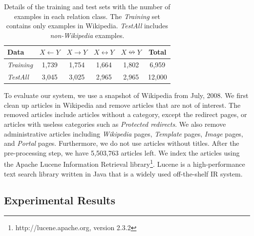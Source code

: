 \begin{table}[h]
  \small
  \begin{center}
    \begin{tabular}{|l||c|c|c|c|c|}
      \hline
      Data & $X \leftarrow Y$ & $X \rightarrow Y$  & $X \leftrightarrow Y$  & $X \nleftrightarrow Y$ & Total \\
      \hline
      \hline
      {\em Training}  & 1,739 & 1,754 & 1,664 & 1,802 & 6,959\\
      {\em TestAll} & 3,045 & 3,025 & 2,965 & 2,965 & 12,000 \\
      \hline
    \end{tabular}
    \caption{Details of the training and test sets with the number of
      examples in each relation class. The {\em Training} set
      contains only examples in Wikipedia. {\em TestAll} includes {\em
        non-Wikipedia} examples.}
    \label{tab:detail-dataset}
  \end{center}
\end{table}

To evaluate our system, we use a snapshot of Wikipedia from July,
2008. We first clean up articles in Wikipedia and remove articles that
are not of interest. The removed articles include articles without a
category, except the redirect pages, or articles with useless
categories such as {\em Protected redirects}. We also remove
administrative articles including {\em Wikipedia} pages, {\em
  Template} pages, {\em Image} pages, and {\em Portal}
pages. Furthermore, we do not use articles without titles. After the
pre-processing step, we have 5,503,763 articles left. We index the
articles using the Apache Lucene Information Retrieval
library\footnote{http://lucene.apache.org, version 2.3.2}. Lucene is a
high-performance text search library written in Java that is a
widely used off-the-shelf IR system.

\subsection{Experimental Results}
\label{sec:exp-results}

